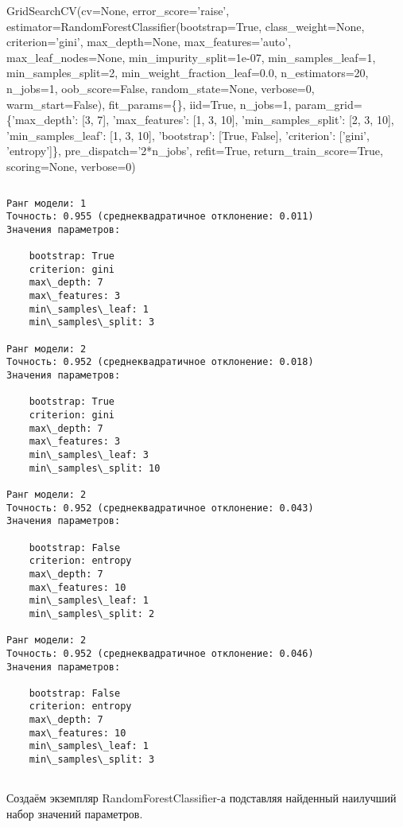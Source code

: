 \documentclass[11pt]{article}
\begin{document}
            GridSearchCV(cv=None, error\_score='raise',
       estimator=RandomForestClassifier(bootstrap=True, class\_weight=None, criterion='gini',
            max\_depth=None, max\_features='auto', max\_leaf\_nodes=None,
            min\_impurity\_split=1e-07, min\_samples\_leaf=1,
            min\_samples\_split=2, min\_weight\_fraction\_leaf=0.0,
            n\_estimators=20, n\_jobs=1, oob\_score=False, random\_state=None,
            verbose=0, warm\_start=False),
       fit\_params=\{\}, iid=True, n\_jobs=1,
       param\_grid=\{'max\_depth': [3, 7], 'max\_features': [1, 3, 10], 'min\_samples\_split': [2, 3, 10], 'min\_samples\_leaf': [1, 3, 10], 'bootstrap': [True, False], 'criterion': ['gini', 'entropy']\},
       pre\_dispatch='2*n\_jobs', refit=True, return\_train\_score=True,
       scoring=None, verbose=0)
        
    \begin{Verbatim}[commandchars=\\\{\}]

\end{Verbatim}

    \begin{Verbatim}[commandchars=\\\{\}]
Ранг модели: 1
Точность: 0.955 (среднеквадратичное отклонение: 0.011)
Значения параметров:

	bootstrap: True
	criterion: gini
	max\_depth: 7
	max\_features: 3
	min\_samples\_leaf: 1
	min\_samples\_split: 3

Ранг модели: 2
Точность: 0.952 (среднеквадратичное отклонение: 0.018)
Значения параметров:

	bootstrap: True
	criterion: gini
	max\_depth: 7
	max\_features: 3
	min\_samples\_leaf: 3
	min\_samples\_split: 10

Ранг модели: 2
Точность: 0.952 (среднеквадратичное отклонение: 0.043)
Значения параметров:

	bootstrap: False
	criterion: entropy
	max\_depth: 7
	max\_features: 10
	min\_samples\_leaf: 1
	min\_samples\_split: 2

Ранг модели: 2
Точность: 0.952 (среднеквадратичное отклонение: 0.046)
Значения параметров:

	bootstrap: False
	criterion: entropy
	max\_depth: 7
	max\_features: 10
	min\_samples\_leaf: 1
	min\_samples\_split: 3


    \end{Verbatim}

    Создаём экземпляр RandomForestClassifier-а подставляя найденный
наилучший набор значений параметров.
\end{document}
